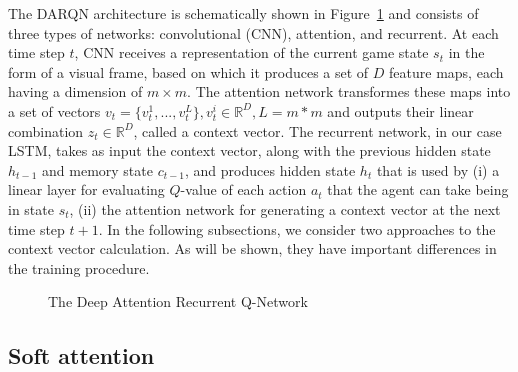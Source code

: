 \documentclass{article} \usepackage{nips15submit_e,times}
\begin{document}
The DARQN architecture is schematically shown in Figure~\ref{fig:model} and consists of three types of networks:
convolutional (CNN), attention, and recurrent. At each time step $t$, CNN receives a representation
of the current game state $s_t$ in the form of a visual frame, based on which it produces a set of $D$ feature maps, each having a dimension of $m\times{m}$. The attention network transformes these maps into a set of vectors $v_t = \{v_t^1,...,v_t^L\}, v_t^i\in{\mathbb{R}^D}, L=m*m$ and outputs
their linear combination $z_t\in{\mathbb{R}^D}$, called a context vector. The recurrent network, in our case LSTM,
takes as input the context vector, along with the previous hidden state $h_{t-1}$ and memory state $c_{t-1}$, and produces hidden state $h_t$ that is used by (i) a linear layer for evaluating $Q$-value of each action $a_t$ that the agent can take being in state $s_t$, (ii) the attention network for generating a context vector at the next time step $t+1$.
In the following subsections, we consider two approaches to the context vector calculation. As will be shown, they have important differences in the training procedure. \par

\begin{figure}
\centering
{}
\caption{The Deep Attention Recurrent Q-Network}
\label{fig:model}
\end{figure}

\subsection{Soft attention}
\end{document}
